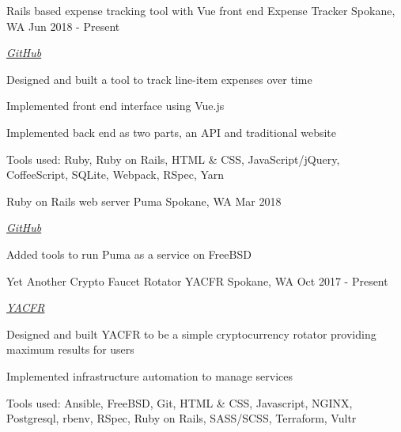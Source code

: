 

\begin{cventries}

  \cventry
    {Rails based expense tracking tool with Vue front end} %
    {Expense Tracker} %
    {Spokane, WA} %
    {Jun 2018 - Present} %
    {
      \begin{cvitems} %
        \item {\emph{\href{https://github.com/desnudopenguino/expense-tracker}{GitHub}}}
        \item {Designed and built a tool to track line-item expenses over time}
        \item {Implemented front end interface using Vue.js}
        \item {Implemented back end as two parts, an API and traditional website}
        \item {Tools used: Ruby, Ruby on Rails, HTML \& CSS, JavaScript/jQuery, CoffeeScript, SQLite, Webpack, RSpec, Yarn}
      \end{cvitems}
    }

  \cventry
    {Ruby on Rails web server} %
    {Puma} %
    {Spokane, WA} %
    {Mar 2018} %
    {
      \begin{cvitems} %
        \item {\emph{\href{https://github.com/puma/puma/tree/master/tools/jungle/rc.d}{GitHub}}}
        \item {Added tools to run Puma as a service on FreeBSD}
      \end{cvitems}
    }

  \cventry
    {Yet Another Crypto Faucet Rotator} %
    {YACFR} %
    {Spokane, WA} %
    {Oct 2017 - Present} %
    {
      \begin{cvitems} %
        \item {\emph{\href{https://yacfr.com}{YACFR}}}
        \item {Designed and built YACFR to be a simple cryptocurrency rotator providing maximum results for users}
        \item {Implemented infrastructure automation to manage services}
        \item {Tools used: Ansible, FreeBSD, Git, HTML \& CSS, Javascript, NGINX, Postgresql, rbenv, RSpec, Ruby on Rails, SASS/SCSS, Terraform, Vultr}
      \end{cvitems}
    }


\end{cventries}
